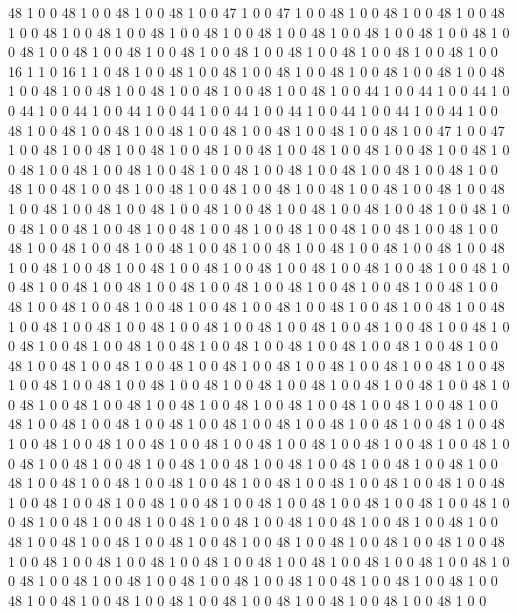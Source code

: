 48
1
0
0
48
1
0
0
48
1
0
0
48
1
0
0
47
1
0
0
47
1
0
0
48
1
0
0
48
1
0
0
48
1
0
0
48
1
0
0
48
1
0
0
48
1
0
0
48
1
0
0
48
1
0
0
48
1
0
0
48
1
0
0
48
1
0
0
48
1
0
0
48
1
0
0
48
1
0
0
48
1
0
0
48
1
0
0
48
1
0
0
48
1
0
0
48
1
0
0
48
1
0
0
48
1
0
0
48
1
0
0
16
1
1
0
16
1
1
0
48
1
0
0
48
1
0
0
48
1
0
0
48
1
0
0
48
1
0
0
48
1
0
0
48
1
0
0
48
1
0
0
48
1
0
0
48
1
0
0
48
1
0
0
48
1
0
0
48
1
0
0
48
1
0
0
44
1
0
0
44
1
0
0
44
1
0
0
44
1
0
0
44
1
0
0
44
1
0
0
44
1
0
0
44
1
0
0
44
1
0
0
44
1
0
0
44
1
0
0
44
1
0
0
48
1
0
0
48
1
0
0
48
1
0
0
48
1
0
0
48
1
0
0
48
1
0
0
48
1
0
0
48
1
0
0
47
1
0
0
47
1
0
0
48
1
0
0
48
1
0
0
48
1
0
0
48
1
0
0
48
1
0
0
48
1
0
0
48
1
0
0
48
1
0
0
48
1
0
0
48
1
0
0
48
1
0
0
48
1
0
0
48
1
0
0
48
1
0
0
48
1
0
0
48
1
0
0
48
1
0
0
48
1
0
0
48
1
0
0
48
1
0
0
48
1
0
0
48
1
0
0
48
1
0
0
48
1
0
0
48
1
0
0
48
1
0
0
48
1
0
0
48
1
0
0
48
1
0
0
48
1
0
0
48
1
0
0
48
1
0
0
48
1
0
0
48
1
0
0
48
1
0
0
48
1
0
0
48
1
0
0
48
1
0
0
48
1
0
0
48
1
0
0
48
1
0
0
48
1
0
0
48
1
0
0
48
1
0
0
48
1
0
0
48
1
0
0
48
1
0
0
48
1
0
0
48
1
0
0
48
1
0
0
48
1
0
0
48
1
0
0
48
1
0
0
48
1
0
0
48
1
0
0
48
1
0
0
48
1
0
0
48
1
0
0
48
1
0
0
48
1
0
0
48
1
0
0
48
1
0
0
48
1
0
0
48
1
0
0
48
1
0
0
48
1
0
0
48
1
0
0
48
1
0
0
48
1
0
0
48
1
0
0
48
1
0
0
48
1
0
0
48
1
0
0
48
1
0
0
48
1
0
0
48
1
0
0
48
1
0
0
48
1
0
0
48
1
0
0
48
1
0
0
48
1
0
0
48
1
0
0
48
1
0
0
48
1
0
0
48
1
0
0
48
1
0
0
48
1
0
0
48
1
0
0
48
1
0
0
48
1
0
0
48
1
0
0
48
1
0
0
48
1
0
0
48
1
0
0
48
1
0
0
48
1
0
0
48
1
0
0
48
1
0
0
48
1
0
0
48
1
0
0
48
1
0
0
48
1
0
0
48
1
0
0
48
1
0
0
48
1
0
0
48
1
0
0
48
1
0
0
48
1
0
0
48
1
0
0
48
1
0
0
48
1
0
0
48
1
0
0
48
1
0
0
48
1
0
0
48
1
0
0
48
1
0
0
48
1
0
0
48
1
0
0
48
1
0
0
48
1
0
0
48
1
0
0
48
1
0
0
48
1
0
0
48
1
0
0
48
1
0
0
48
1
0
0
48
1
0
0
48
1
0
0
48
1
0
0
48
1
0
0
48
1
0
0
48
1
0
0
48
1
0
0
48
1
0
0
48
1
0
0
48
1
0
0
48
1
0
0
48
1
0
0
48
1
0
0
48
1
0
0
48
1
0
0
48
1
0
0
48
1
0
0
48
1
0
0
48
1
0
0
48
1
0
0
48
1
0
0
48
1
0
0
48
1
0
0
48
1
0
0
48
1
0
0
48
1
0
0
48
1
0
0
48
1
0
0
48
1
0
0
48
1
0
0
48
1
0
0
48
1
0
0
48
1
0
0
48
1
0
0
48
1
0
0
48
1
0
0
48
1
0
0
48
1
0
0
48
1
0
0
48
1
0
0
48
1
0
0
48
1
0
0
48
1
0
0
48
1
0
0
48
1
0
0
48
1
0
0
48
1
0
0
48
1
0
0
48
1
0
0
48
1
0
0
48
1
0
0
48
1
0
0
48
1
0
0
48
1
0
0
48
1
0
0
48
1
0
0
48
1
0
0
48
1
0
0
48
1
0
0
48
1
0
0
48
1
0
0
48
1
0
0
48
1
0
0
48
1
0
0
48
1
0
0
48
1
0
0
48
1
0
0
48
1
0
0
48
1
0
0
48
1
0
0
48
1
0
0
48
1
0
0
48
1
0
0
48
1
0
0
48
1
0
0
48
1
0
0
48
1
0
0
48
1
0
0
48
1
0
0
48
1
0
0
48
1
0
0
48
1
0
0
48
1
0
0
48
1
0
0
48
1
0
0
48
1
0
0
48
1
0
0
48
1
0
0
48
1
0
0
48
1
0
0
48
1
0
0
48
1
0
0
48
1
0
0
48
1
0
0
48
1
0
0
48
1
0
0
48
1
0
0
